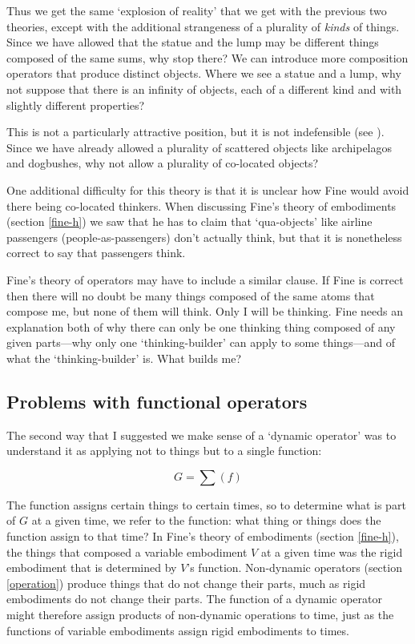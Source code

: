\documentclass[11pt]{article}
\begin{document}
\begin{spacing}{1.5}
Thus we get the same `explosion of reality' that we get with the
previous two theories, except with the additional strangeness of a
plurality of {\em kinds} of things.  Since we have allowed that the
statue and the lump may be different things composed of the same sums,
why stop there?  We can introduce more composition operators that
produce distinct objects.  Where we see a statue and a lump, why not
suppose that there is an infinity of objects, each of a different kind
and with slightly different properties?

This is not a particularly attractive position, but it is not
indefensible (see \citet[section 4]{bennett2004}).  Since we have
already allowed a plurality of scattered objects like archipelagos and
dogbushes, why not allow a plurality of co-located objects?


One additional difficulty for this theory is that it is unclear how
Fine would avoid there being co-located thinkers.  When discussing
Fine's theory of embodiments (section \ref{fine-h}) we saw that he has
to claim that `qua-objects' like airline passengers
(people-as-passengers) don't actually think, but that it is
nonetheless correct to say that passengers think.

Fine's theory of operators may have to include a similar clause.
If Fine is correct then there will no doubt be many things composed of
the same atoms that compose me, but none of them will think.  Only I
will be thinking.  Fine needs an explanation both of why there can
only be one thinking thing composed of any given parts---why only one
`thinking-builder' can apply to some things---and of what the
`thinking-builder' is.  What builds me?


\subsection{Problems with functional operators}
\label{problems2b}
The second way that I suggested we make sense of a `dynamic operator'
was to understand it as applying not to things but to a single
function:

\begin{displaymath}
G = \sum ( f )
\end{displaymath}

The function assigns certain things to certain times, so to determine
what is part of $G$ at a given time, we refer to the function: what
thing or things does the function assign to that time?  In Fine's
theory of embodiments (section \ref{fine-h}), the things that composed
a variable embodiment $V$ at a given time was the rigid embodiment
that is determined by $V$'s function.  Non-dynamic operators (section
\ref{operation}) produce things that do not change their parts, much as
rigid embodiments do not change their parts.  The function of a
dynamic operator might therefore assign products of non-dynamic
operations to time, just as the functions of variable embodiments
assign rigid embodiments to times.


\end{spacing}
\end{document}
